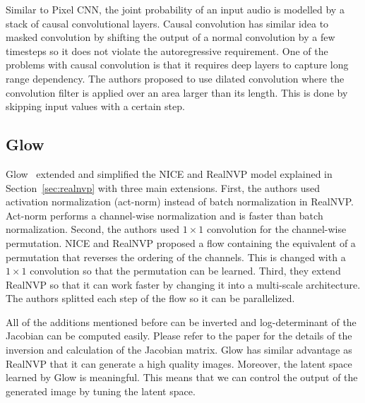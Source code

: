 \documentclass[runningheads]{llncs}
\begin{document}
Similar to Pixel CNN, the joint probability of an input audio is modelled by a stack of causal convolutional layers. Causal convolution has similar idea to masked convolution by shifting the output of a normal convolution by a few timesteps so it does not violate the autoregressive requirement. One of the problems with causal convolution is that it requires deep layers to capture long range dependency. The authors proposed to use dilated convolution where the convolution filter is applied over an area larger than its length. This is done by skipping input values with a certain step. 

\subsection{Glow}
Glow~\cite{kingma2018glow} extended and simplified the NICE and RealNVP model explained in Section~\ref{sec:realnvp} with three main extensions. First, the authors used activation normalization (act-norm) instead of batch normalization in RealNVP.  Act-norm performs a channel-wise normalization and is faster than batch normalization. Second, the authors used $1\times1$ convolution for the channel-wise permutation. NICE and RealNVP proposed a flow containing the equivalent of a permutation that reverses the ordering of the channels. This is changed with a $1\times1$ convolution so that the permutation can be learned.  Third, they extend RealNVP so that it can work faster by changing it into a multi-scale architecture. The authors splitted each step of the flow so it can be parallelized.

All of the additions mentioned before can be inverted and log-determinant of the Jacobian can be computed easily. Please refer to the paper for the details of the inversion and calculation of the Jacobian matrix. Glow has similar advantage as RealNVP that it can generate a high quality images. Moreover, the latent space learned by Glow is meaningful. This means that we can control the output of the generated image by tuning the latent space.
\end{document}

